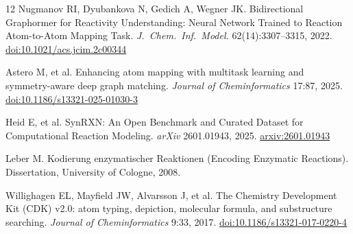 \documentclass[11pt,a4paper]{article}
\begin{document}
\begin{thebibliography}{12}
Nugmanov RI, Dyubankova N, Gedich A, Wegner JK.
Bidirectional Graphormer for Reactivity Understanding: Neural Network Trained
to Reaction Atom-to-Atom Mapping Task.
\textit{J.\ Chem.\ Inf.\ Model.} 62(14):3307--3315, 2022.
\href{https://doi.org/10.1021/acs.jcim.2c00344}{doi:10.1021/acs.jcim.2c00344}

Astero M, et al.
Enhancing atom mapping with multitask learning and symmetry-aware deep graph
matching.
\textit{Journal of Cheminformatics} 17:87, 2025.
\href{https://doi.org/10.1186/s13321-025-01030-3}{doi:10.1186/s13321-025-01030-3}

Heid E, et al.
SynRXN: An Open Benchmark and Curated Dataset for Computational Reaction Modeling.
\textit{arXiv} 2601.01943, 2025.
\href{https://arxiv.org/abs/2601.01943}{arxiv:2601.01943}

Leber M.
Kodierung enzymatischer Reaktionen (Encoding Enzymatic Reactions).
Dissertation, University of Cologne, 2008.

Willighagen EL, Mayfield JW, Alvarsson J, et al.
The Chemistry Development Kit (CDK) v2.0: atom typing, depiction, molecular
formula, and substructure searching.
\textit{Journal of Cheminformatics} 9:33, 2017.
\href{https://doi.org/10.1186/s13321-017-0220-4}{doi:10.1186/s13321-017-0220-4}

\end{thebibliography}
\end{document}
